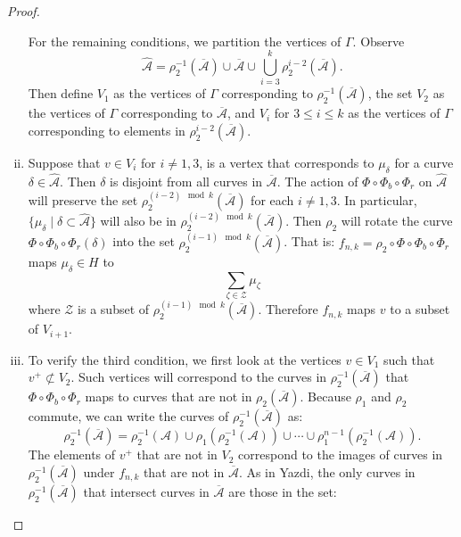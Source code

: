 \begin{proof}
\begin{enumerate}[(i)]
\medskip
For the remaining conditions, we partition the vertices of $\Gamma$.  Observe
$$\widehat{\mathcal{A}} = \rho_{2}^{-1}(\overline{\mathcal{A}})\cup\overline{\mathcal{A}}\cup\bigcup_{i=3}^k \rho_2^{i-2}(\overline{\mathcal{A}}).$$ Then define $V_1$ as the vertices of $\Gamma$ corresponding to $\rho_2^{-1}(\overline{\mathcal{A}})$, the set $V_2$ as the vertices of $\Gamma$ corresponding to $\overline{\mathcal{A}}$, and $V_i$ for
$3 \leq i \leq k$ as the vertices of $\Gamma$ corresponding to elements in
$\rho_2^{i-2}(\overline{\mathcal{A}})$.
\item Suppose that $v \in V_i$ for $i \neq 1,3$, is a vertex
  that corresponds to $\mu_\delta$ for a curve $\delta \in \widehat{\mathcal{A}}$.  %
  Then $\delta$ is disjoint from all curves in $\overline{\mathcal{A}}$.  The action of $\Phi\circ\Phi_b\circ\Phi_r$ on $\widehat{\mathcal{A}}$ will preserve the set $\rho_2^{(i-2)\mod k}(\overline{\mathcal{A}})$ for each $i\neq 1,3$.  In particular, $\{\mu_\delta \mid \delta\subset\widehat{\mathcal{A}}\}$ will also be in $\rho_2^{(i-2)\mod k}(\overline{\mathcal{A}})$.  %
  Then $\rho_2$ will rotate the curve $\Phi\circ \Phi_b\circ\Phi_r(\delta)$ into the set $\rho_2^{(i-1)\mod k}(\overline{\mathcal{A}})$. That is: $f_{n,k}=\rho_2\circ\Phi\circ\Phi_b\circ\Phi_r$ maps $\mu_\delta\in H$ to $$\sum_{\zeta\in \mathcal{Z}}\mu_\zeta$$ where $\mathcal{Z}$ is a subset of $\rho_2^{(i-1)\mod k}(\overline{\mathcal{A}})$.  Therefore $f_{n,k}$ maps $v$ to a subset of $V_{i+1}$.
\item To verify the third condition, we first look at the vertices $v \in V_1$ such that $v^+ \not\subset V_2$. Such vertices will correspond to the curves in $\rho_2^{-1}(\overline{\mathcal{A}})$ that $\Phi\circ\Phi_b\circ\Phi_r$ maps to curves that are not in $\rho_2(\overline{\mathcal{A}})$.  Because $\rho_1$ and $\rho_2$ commute, we can write the curves of $\rho_2^{-1}(\overline{\mathcal{A}})$ as:
    $$\rho_2^{-1}(\overline{\mathcal{A}})=\rho_2^{-1}(\mathcal{A})\cup\rho_1(\rho_2^{-1}(\mathcal{A}))\cup\cdots\cup\rho_1^{n-1}(\rho_2^{-1}(\mathcal{A})).$$  The elements of $v^+$ that are not in $V_2$ correspond to the images of curves in $\rho_2^{-1}(\overline{\mathcal{A}})$ under $f_{n,k}$ that are not in $\overline{\mathcal{A}}$.
As in Yazdi, the only curves in $\rho_2^{-1}(\overline{\mathcal{A}})$ that intersect curves in $\overline{\mathcal{A}}$ are those in the set:

\end{enumerate}
\end{proof}
